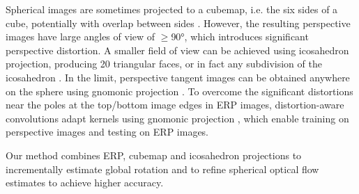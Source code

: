 Spherical images are sometimes projected to a cubemap,
i.e. the six sides of a cube, potentially with overlap between sides \cite{ChengCDWLS2018, WangHCLYSCS2018, WangYSCT2020}.
However, the resulting perspective images have large angles of view of $\geq$90°, which introduces significant perspective distortion.
%
A smaller field of view can be achieved using icosahedron projection, producing 20 triangular faces, or in fact any subdivision of the icosahedron \citep{LuoZSX2019, ZhangLSC2019, LeeJYJY2019}.
In the limit, perspective tangent images can be obtained anywhere on the sphere using gnomonic projection \citep{CoorsCG2018, EderSLF2020}.
%
To overcome the significant distortions near the poles at the top/bottom image edges in ERP images, distortion-aware convolutions adapt kernels using gnomonic projection \cite{CoorsCG2018, SuG2019, TatenNT2018}, which enable training on perspective images and testing on ERP images.


Our method combines ERP, cubemap and icosahedron projections to incrementally estimate global rotation and to refine spherical optical flow estimates to achieve higher accuracy.






